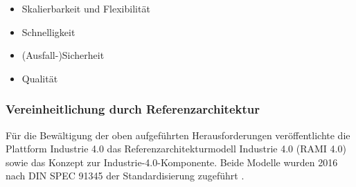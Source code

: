 \begin{itemize}
  \item Skalierbarkeit und Flexibilität
  \item Schnelligkeit
  \item (Ausfall-)Sicherheit
  \item Qualität
\end{itemize}

\subsubsection{Vereinheitlichung durch Referenzarchitektur}\label{rami}

Für die Bewältigung der oben aufgeführten Herausforderungen veröffentlichte die Plattform Industrie 4.0 das \glqq Referenzarchitekturmodell Industrie 4.0\grqq{} (RAMI 4.0) sowie das Konzept zur \glqq Industrie-4.0-Komponente\grqq{}. Beide Modelle wurden 2016 nach DIN SPEC 91345 der Standardisierung zugeführt \citep{Beuth2016}.

